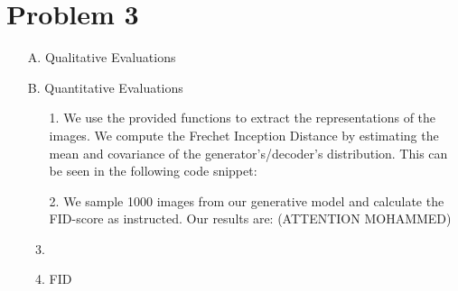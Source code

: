 \section*{Problem 3}
\begin{itemize}
\item[A.] {Qualitative Evaluations}\\

    \item [B.] {Quantitative Evaluations}\\
    \begin{enumerate}
        \item[1.]
       We use the provided functions to extract the representations of the images. We compute the Frechet Inception Distance by estimating the mean and covariance of the generator's/decoder's distribution. This can be seen in the following code snippet:
    
        \item[2.] We sample 1000 images from our generative model and calculate the FID-score as instructed. Our results are: (ATTENTION MOHAMMED)
        \item
        \item FID
        
    \end{enumerate}
\end{itemize}

